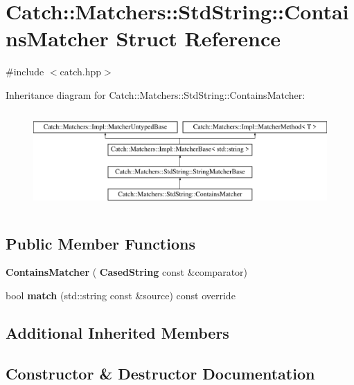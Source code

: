 \section{Catch\+::Matchers\+::Std\+String\+::Contains\+Matcher Struct Reference}
\label{struct_catch_1_1_matchers_1_1_std_string_1_1_contains_matcher}


{\ttfamily \#include $<$catch.\+hpp$>$}

Inheritance diagram for Catch\+::Matchers\+::Std\+String\+::Contains\+Matcher\+:\begin{figure}[H]
\begin{center}
\leavevmode
\includegraphics[height=3.758389cm]{struct_catch_1_1_matchers_1_1_std_string_1_1_contains_matcher}
\end{center}
\end{figure}
\subsection*{Public Member Functions}
\begin{DoxyCompactItemize}
\item 
\textbf{ Contains\+Matcher} (\textbf{ Cased\+String} const \&comparator)
\item 
bool \textbf{ match} (std\+::string const \&source) const override
\end{DoxyCompactItemize}
\subsection*{Additional Inherited Members}


\subsection{Constructor \& Destructor Documentation}
\mbox{\label{struct_catch_1_1_matchers_1_1_std_string_1_1_contains_matcher_acc892883c8409e34b28c9b39d4ef1fe3}} 
